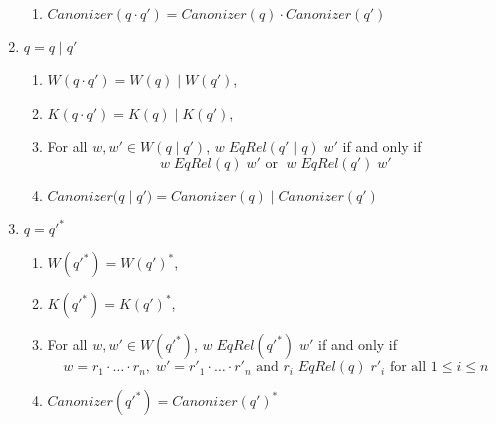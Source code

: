 \documentclass{svproc}
\begin{document}
\begin{enumerate}
\begin{center}
\begin{enumerate}
\item
$Canonizer(q \cdot q') = Canonizer(q) \cdot Canonizer(q')
$
\end{enumerate}
\begin{prooftree}
\end{prooftree}
\end{center}
\item $q=q \; | \;  q'$
\begin{center}
\begin{enumerate}
  \item $W(q \cdot q') = W(q) \; | \; W(q')$,
  \item $K(q \cdot q') = K(q) \; | \; K(q')$, 
  \item
For all $w, w' \in W(q \; | \; q')$, $w \; EqRel(q' \; | \; q) \; w'$ if and
only if 
$$w \; EqRel(q) \; w' \text{ or } \; w \; EqRel(q') \; w'$$
\item
$Canonizer(q \; | \; q') = Canonizer(q) \; | \; Canonizer(q')
$
\end{enumerate}
\begin{prooftree}
\end{prooftree}
\end{center}
\item $q=q'^*$
\begin{center}
\begin{enumerate}
  \item $W(q'^*) = W(q')^*$,
  \item $K(q'^*) = K(q')^*$, 
  \item
For all $w, w' \in W(q'^*)$, $w \; EqRel(q'^*) \; w'$ if and
only if 
$$w = r_1 \cdot \ldots \cdot r_n, \; w' = {r'}_1 \cdot \ldots
      \cdot {r'}_n \text{ and } r_i \; EqRel(q) \; {r'}_i
      \text{ for all } 1 \leq i \leq n$$
      \item
$Canonizer(q'^*) = Canonizer(q')^* $
\end{enumerate}
\begin{prooftree}
\end{prooftree}
\end{center}
\end{enumerate}
\end{document}
